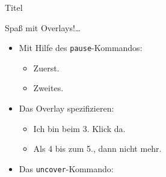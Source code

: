 \documentclass{beamer}
\begin{document}
\begin{frame}{Titel}

 Spaß mit Overlays!\dots
  \begin{itemize}
  \item Mit Hilfe des \texttt{pause}-Kommandos:
    \begin{itemize}
    \item Zuerst.
      \pause 
    \item Zweites.
    \end{itemize}
  \item
    Das Overlay spezifizieren:
    \begin{itemize}
    \item<3->
      Ich bin beim 3. Klick da.
    \item<4-5>
      Als 4 bis zum 5., dann nicht mehr.
    \end{itemize}
  \item
    Das \texttt{uncover}-Kommando:
    \begin{itemize}
    \end{itemize}
  \end{itemize}

\end{frame}
\end{document}

